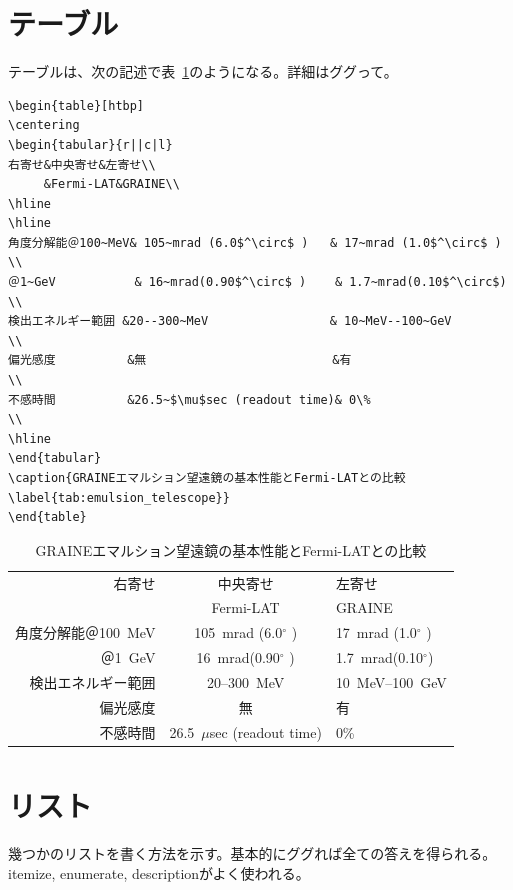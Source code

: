 \documentclass[a4j]{jsarticle}
\begin{document}
\section{テーブル}
テーブルは、次の記述で表~\ref{tab:emulsion_telescope}のようになる。詳細はググって。
\begin{verbatim}
\begin{table}[htbp]
\centering
\begin{tabular}{r||c|l}
右寄せ&中央寄せ&左寄せ\\
     &Fermi-LAT&GRAINE\\
\hline
\hline
角度分解能＠100~MeV& 105~mrad (6.0$^\circ$ )   & 17~mrad (1.0$^\circ$ ) \\
＠1~GeV           & 16~mrad(0.90$^\circ$ )    & 1.7~mrad(0.10$^\circ$) \\
検出エネルギー範囲 &20--300~MeV                 & 10~MeV--100~GeV        \\
偏光感度          &無                          &有                      \\
不感時間          &26.5~$\mu$sec (readout time)& 0\%                    \\
\hline
\end{tabular}
\caption{GRAINEエマルション望遠鏡の基本性能とFermi-LATとの比較\label{tab:emulsion_telescope}}
\end{table}
\end{verbatim}
\begin{table}[htbp]
\centering
\begin{tabular}{r||c|l}
右寄せ&中央寄せ&左寄せ\\
     &Fermi-LAT&GRAINE\\
\hline
\hline
角度分解能＠100~MeV& 105~mrad (6.0$^\circ$ )   & 17~mrad (1.0$^\circ$ ) \\
＠1~GeV           & 16~mrad(0.90$^\circ$ )    & 1.7~mrad(0.10$^\circ$) \\
検出エネルギー範囲 &20--300~MeV                 & 10~MeV--100~GeV        \\
偏光感度          &無                          &有                      \\
不感時間          &26.5~$\mu$sec (readout time)& 0\%                    \\
\hline
\end{tabular}
\caption{GRAINEエマルション望遠鏡の基本性能とFermi-LATとの比較\label{tab:emulsion_telescope}}
\end{table}

\newpage
\section{リスト}
幾つかのリストを書く方法を示す。基本的にググれば全ての答えを得られる。itemize, enumerate, descriptionがよく使われる。
\end{document}
